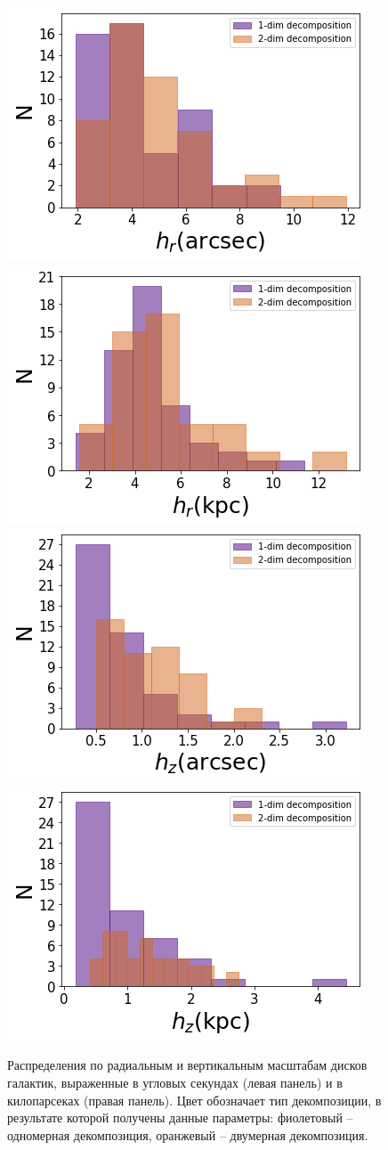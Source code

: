 \begin{figure}[th]
    \centering
    \includegraphics[width=.5\textwidth]{plot_results/h_arcsec.png}\hfill
    \includegraphics[width=.5\textwidth]{plot_results/h_kpc.png}\hfill\\
    \includegraphics[width=.5\textwidth]{plot_results/h_z_arcsec.png}\hfill
    \includegraphics[width=.5\textwidth]{plot_results/h_z_kpc.png}\hfill\\

    \caption{Распределения по радиальным и вертикальным масштабам дисков галактик, выраженные в угловых секундах (левая панель) и в килопарсеках (правая панель). Цвет обозначает тип декомпозиции, в результате которой получены данные параметры: фиолетовый -- одномерная декомпозиция, оранжевый -- двумерная декомпозиция.}\label{fig:hz_hist}
\end{figure}

